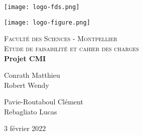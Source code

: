 \documentclass[a4paper, 12pt]{article}
\begin{document}
\begin{titlepage}
  \begin{sffamily}
  \begin{center}
  

\begin{minipage}[c]{.46\linewidth}
     \begin{center}
             \texttt{[image: logo-fds.png]}
         \end{center}
   \end{minipage} \hfill
   \begin{minipage}[c]{.46\linewidth}
    \begin{center}
            \texttt{[image: logo-figure.png]}
        \end{center}
 \end{minipage}
\newline \newline


    \textsc{\LARGE Faculté des Sciences - Montpellier}\\[2cm]

    \textsc{\Large Etude de faisabilité et cahier des charges}\\[1.5cm]

     
    { \huge \bfseries Projet CMI\\[0.4cm] }

     

    \begin{minipage}{0.4\textwidth}
      \begin{flushleft} \large
        Conrath Matthieu\\
        Robert Wendy\\
      \end{flushleft}
    \end{minipage}
    \begin{minipage}{0.4\textwidth}
      \begin{flushright} \large
       Pavie-Routaboul Clément\\
        Rebagliato Lucas\\
      \end{flushright}
    \end{minipage}

    \vfill

    {\large 3 février 2022}

  \end{center}
  \end{sffamily}
\end{titlepage}
\end{document}

